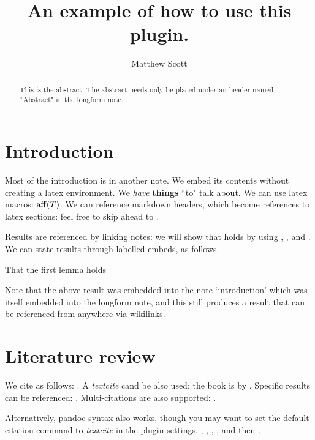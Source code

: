 \documentclass{article}
\title{An example of how to use this plugin.}
\author{Matthew Scott}
\begin{document}
\maketitle
\begin{abstract}
This is the abstract. The abstract needs only be placed under an header named ``Abstract" in the longform note.
\end{abstract}
\section{Introduction}
\label{loc:body.introduction}
Most of the introduction is in another note. We embed its contents without creating a latex environment.
We \emph{have} \textbf{things} ``to" talk about. We can use latex macros: $\operatorname{aff}(T)$. We can reference markdown headers, which become references to latex sections: feel free to skip ahead to .

Results are referenced by linking notes: we will show that  holds by using , ,  and . We can state results through labelled embeds, as follows. 
\begin{lemma}

\label{loc:other_small_lemmas.second_other_lemma}
That the first lemma holds
\end{lemma}
Note that the above result was embedded into the note `introduction' which was itself embedded into the longform note, and this still produces a result that can be referenced from anywhere via wikilinks.
\section{Literature review}
\label{loc:body.literature_review}
We cite as follows: \cite{vershyninHighDimensionalProbabilityIntroduction2018}. A \emph{textcite} cand be also used: the book is by \textcite{vershyninHighDimensionalProbabilityIntroduction2018}. Specific results can be referenced: \cite[Example 5.4]{vershyninHighDimensionalProbabilityIntroduction2018}. Multi-citations are also supported: \cite{berkCoherenceParameterCharacterizing2022, berkModeladaptedFourierSampling2023}.

Alternatively, pandoc syntax also works, though you may want to set the default citation command to \emph{textcite} in the plugin settings. \cite{vershyninHighDimensionalProbabilityIntroduction2018}, \cite{vershyninHighDimensionalProbabilityIntroduction2018}, \cite[Example 2.1]{vershyninHighDimensionalProbabilityIntroduction2018}, \cite{berkCoherenceParameterCharacterizing2022, berkModeladaptedFourierSampling2023}, and then \cite{vershyninHighDimensionalProbabilityIntroduction2018}.
\end{document}
